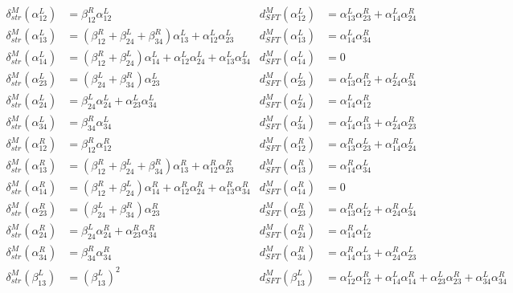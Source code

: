 \documentclass[a4paper,final, reqno]{amsart}
\theoremstyle{plain}
\theoremstyle{definition}
\begin{document}
		\begin{align*}
			\delta_{str}^M(\alpha_{12}^L) &= \beta_{12}^R\alpha_{12}^L & d_{SFT}^M(\alpha_{12}^L) &= \alpha_{13}^L\alpha_{23}^R + \alpha_{14}^L\alpha_{24}^R \\
			\delta_{str}^M(\alpha_{13}^L) &= (\beta_{12}^R+\beta_{24}^L+\beta_{34}^R)\alpha_{13}^L + \alpha_{12}^L\alpha_{23}^L & d_{SFT}^M(\alpha_{13}^L) &= \alpha_{14}^L\alpha_{34}^R \\
			\delta_{str}^M(\alpha_{14}^L) &= (\beta_{12}^R+\beta_{24}^L)\alpha_{14}^L + \alpha_{12}^L\alpha_{24}^L + \alpha_{13}^L\alpha_{34}^L & d_{SFT}^M(\alpha_{14}^L) &= 0 \\
			\delta_{str}^M(\alpha_{23}^L) &= (\beta_{24}^L + \beta_{34}^R)\alpha_{23}^L & d_{SFT}^M(\alpha_{23}^L) &= \alpha_{13}^L\alpha_{12}^R + \alpha_{24}^L\alpha_{34}^R \\
			\delta_{str}^M(\alpha_{24}^L) &= \beta_{24}^L\alpha_{24}^L + \alpha_{23}^L\alpha_{34}^L & d_{SFT}^M(\alpha_{24}^L) &= \alpha_{14}^L\alpha_{12}^R \\
			\delta_{str}^M(\alpha_{34}^L) &= \beta_{34}^R\alpha_{34}^L & d_{SFT}^M(\alpha_{34}^L) &= \alpha_{14}^L\alpha_{13}^R+\alpha_{24}^L\alpha_{23}^R \\
			\delta_{str}^M(\alpha_{12}^R) &= \beta_{12}^R\alpha_{12}^R & d_{SFT}^M(\alpha_{12}^R) &= \alpha_{13}^R\alpha_{23}^L + \alpha_{14}^R\alpha_{24}^L \\
			\delta_{str}^M(\alpha_{13}^R) &= (\beta_{12}^R+\beta_{24}^L+\beta_{34}^R)\alpha_{13}^R + \alpha_{12}^R\alpha_{23}^R & d_{SFT}^M(\alpha_{13}^R) &= \alpha_{14}^R\alpha_{34}^L \\
			\delta_{str}^M(\alpha_{14}^R) &= (\beta_{12}^R+\beta_{24}^L)\alpha_{14}^R + \alpha_{12}^R\alpha_{24}^R + \alpha_{13}^R\alpha_{34}^R & d_{SFT}^M(\alpha_{14}^R) &= 0 \\
			\delta_{str}^M(\alpha_{23}^R) &= (\beta_{24}^L + \beta_{34}^R)\alpha_{23}^R & d_{SFT}^M(\alpha_{23}^R) &= \alpha_{13}^R\alpha_{12}^L + \alpha_{24}^R\alpha_{34}^L \\
			\delta_{str}^M(\alpha_{24}^R) &= \beta_{24}^L\alpha_{24}^R + \alpha_{23}^R\alpha_{34}^R & d_{SFT}^M(\alpha_{24}^R) &= \alpha_{14}^R\alpha_{12}^L \\
			\delta_{str}^M(\alpha_{34}^R) &= \beta_{34}^R\alpha_{34}^R & d_{SFT}^M(\alpha_{34}^R) &= \alpha_{14}^R\alpha_{13}^L+\alpha_{24}^R\alpha_{23}^L \\
			\delta_{str}^M(\beta_{13}^L) &= \left(\beta_{13}^L\right)^2 & d_{SFT}^M(\beta_{13}^L) &= \alpha_{12}^L\alpha_{12}^R + \alpha_{14}^L\alpha_{14}^R + \alpha_{23}^L\alpha_{23}^R + \alpha_{34}^L\alpha_{34}^R \\

\end{align*}
\end{document}
